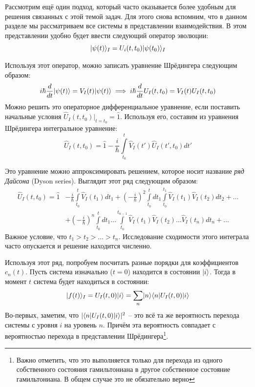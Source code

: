 Рассмотрим ещё один подход, который часто оказывается более удобным для решения
связанных с этой темой задач. Для этого снова вспомним, что в данном разделе мы
рассматриваем все системы в представлении взаимодействия. В этом представлении
удобно будет ввести следующий оператор эволюции:
\[
  \lvert\psi(t)\rangle_{I}=U_{i}(t, t_0)\lvert\psi(t_0)\rangle_I
\]

Используя этот оператор, можно записать уравнение Шрёдингера следующим образом:
\[
  i\hbar\frac{d}{dt} \lvert\psi(t)\rangle = V_{I}(t) \lvert\psi(t)\rangle \implies i\hbar\frac{d}{dt} U_{I}(t, t_0) = V_{I}(t) U_{I}(t, t_0)
\]
Можно решить это операторное дифференциальное уравнение, если поставить
начальные условия $\hat{U}_I(t, t_0)\big|_{t=t_0}=\hat{1}$. Используя его,
составим из уравнения Шрёдингера интегральное уравнение:
\[
  \hat{U}_I(t, t_0) = \hat{1} - \frac{i}{\hbar}\int\limits_{t_0}^{t}\hat{V}_I(t')\hat{U}_I(t', t_0)dt'
\]

Это уравнение можно аппроксимировать решением, которое носит название
\textit{ряд Дайсона} (Dyson series). Выглядит этот ряд следующим образом:
\begin{align*}
  \hat{U}_I(t, t_0) = \hat{1} & - \frac{i}{\hbar}\int\limits_{t_0}^{t}\hat{V}_I(t_1)dt_1 + (-\frac{i}{\hbar})^2 \int\limits_{t_0}^{t} dt_1 \int\limits_{t_0}^{t_1}\hat{V}_I(t_1)\hat{V}_I(t_2)dt_2 + \dots\\
  &+ (-\frac{i}{\hbar})^n \int\limits_{t_0}^{t} dt_1\dots \int\limits_{t_0}^{t_{n-1}}\hat{V}_I(t_1)\hat{V}_I(t_2)\dots \hat{V}_I(t_n)dt_n +\dots
\end{align*}
Важное условие, что $t_1 > t_2 > \dots > t_n$. Исследование сходимости этого
интеграла часто опускается и решение находится численно.

Используя этот ряд, попробуем посчитать разные порядки для коэффициентов $c_n
  (t)$. Пусть система изначально ($t=0$) находится в состоянии $\lvert i\rangle$. Тогда в
момент $t$ система будет находиться в состоянии:
\[
  \lvert f(t)\rangle_I = U_I(t, 0)\lvert i\rangle = \sum\limits_n\lvert n\rangle\langle n\rvert U_I(t, 0)\lvert i\rangle
\]
Во-первых, заметим, что $|\langle n\rvert U_I(t, 0)\lvert i\rangle|^2$ – это всё та же
вероятность перехода системы с уровня $i$ на уровень $n$. Причём эта
вероятность совпадает с вероятностью перехода в представлении
Шрёдингера\footnote{Важно отметить, что это выполняется только для перехода из
  одного собственного состояния гамильтониана в другое собственное состояние
  гамильтониана. В общем случае это не обязательно верно}.

